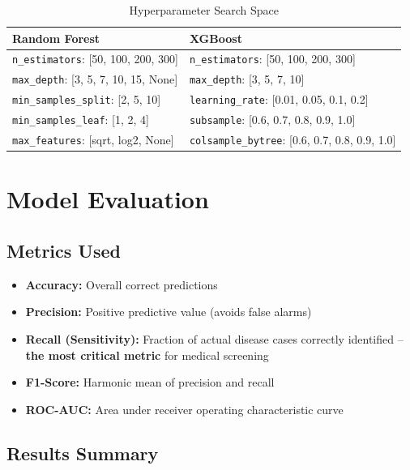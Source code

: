 \documentclass[12pt,a4paper]{article}
\begin{document}
\begin{table}[H]
\centering
\caption{Hyperparameter Search Space}
\begin{tabular}{|l|l|}
\hline
\textbf{Random Forest} & \textbf{XGBoost} \\
\hline
\texttt{n\_estimators}: [50, 100, 200, 300] & \texttt{n\_estimators}: [50, 100, 200, 300] \\
\texttt{max\_depth}: [3, 5, 7, 10, 15, None] & \texttt{max\_depth}: [3, 5, 7, 10] \\
\texttt{min\_samples\_split}: [2, 5, 10] & \texttt{learning\_rate}: [0.01, 0.05, 0.1, 0.2] \\
\texttt{min\_samples\_leaf}: [1, 2, 4] & \texttt{subsample}: [0.6, 0.7, 0.8, 0.9, 1.0] \\
\texttt{max\_features}: [sqrt, log2, None] & \texttt{colsample\_bytree}: [0.6, 0.7, 0.8, 0.9, 1.0] \\
\hline
\end{tabular}
\end{table}

\section{Model Evaluation}

\subsection{Metrics Used}

\begin{itemize}
    \item \textbf{Accuracy:} Overall correct predictions
    \item \textbf{Precision:} Positive predictive value (avoids false alarms)
    \item \textbf{Recall (Sensitivity):} Fraction of actual disease cases correctly identified -- \textbf{the most critical metric} for medical screening
    \item \textbf{F1-Score:} Harmonic mean of precision and recall
    \item \textbf{ROC-AUC:} Area under receiver operating characteristic curve
\end{itemize}

\subsection{Results Summary}
\end{document}
